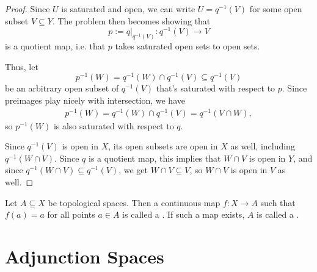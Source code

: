 \begin{proof}
	Since $U$ is saturated and open, we can write $U = q^{-1}(V)$ for some open subset $V \subseteq Y$.
	The problem then becomes showing that $$p := q|_{q^{-1}(V)} : q^{-1}(V) \to V$$ is a quotient map, i.e. that $p$ takes saturated open sets to open sets. 
	
	Thus, let $$p^{-1}(W) = q^{-1}(W) \cap q^{-1}(V) \subseteq q^{-1}(V)$$ be an arbitrary open subset of $q^{-1}(V)$ that's saturated with respect to $p$. Since preimages play nicely with intersection, we have
	\begin{align*}
		p^{-1}(W) = q^{-1}(W) \cap q^{-1}(V) = q^{-1}(V \cap W),
	\end{align*} 
	so $p^{-1}(W)$ is also saturated with respect to $q$.
	
	Since $q^{-1}(V)$ is open in $X$, its open subsets are open in $X$ as well, including $q^{-1}(W \cap V)$. Since $q$ is a quotient map, this implies that $W \cap V$ is open in $Y$, and since $q^{-1}(W \cap V) \subseteq q^{-1}(V)$, we get $W \cap V \subseteq V$, so $W \cap V$ is open in $V$ as well.
\end{proof}
\begin{definition}
	Let $A \subseteq X$ be topological spaces. Then a continuous map $f : X \to A$ such that $f(a) = a$ for all points $a \in A$ is called a . If such a map exists, $A$ is called a .
\end{definition}
\clearpage

\section{Adjunction Spaces}

